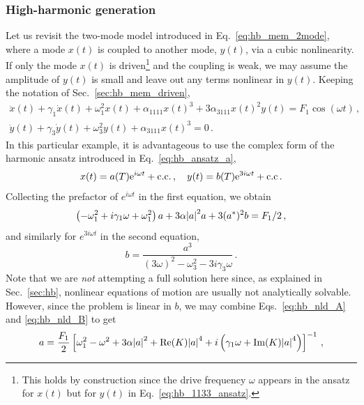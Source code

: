 \subsubsection{High-harmonic generation}

Let us revisit the two-mode model introduced in Eq.~\eqref{eq:hb_mem_2mode}, where a mode $x(t)$ is coupled to another mode, $y(t)$, via a cubic nonlinearity. If only the mode $x(t)$ is driven\footnote{This holds by construction since the drive frequency $\omega$ appears in the ansatz for $x(t)$ but for $y(t)$ in Eq.~\eqref{eq:hb_1133_ansatz}.} and the coupling is weak, we may assume the amplitude of $y(t)$ is small and leave out any terms nonlinear in $y(t)$. Keeping the notation of Sec.~\ref{sec:hb_mem_driven}, 
\begin{equation} \label{eq:hb_nld_eom}
\begin{gathered}
\ddot{x}(t) + \gamma_1 \dot{x}(t) + \omega_1^2 x(t) + \alpha_{1111} x(t)^3 +  3 \alpha_{3111} x(t)^2 y(t) = F_1 \cos(\omega t) \,, \\
\ddot{y}(t) + \gamma_3 \dot{y}(t) + \omega_3^2 y(t) + \alpha_{3111} x(t)^3 = 0 \,.
\end{gathered}
\end{equation}
In this particular example, it is advantageous to use the complex form of the harmonic ansatz introduced in Eq.~\eqref{eq:hb_ansatz_a},
\begin{equation}
x(t) = a(T) {\rm e}^{i \omega t} + \text{c.c.} \,, \quad y(t) = b(T) {\rm e}^{3 i \omega t}  + \text{c.c} \,.
\end{equation}
Collecting the prefactor of  $e^{i \omega t}$ in the first equation, we obtain
\begin{equation} \label{eq:hb_nld_A}
\left(- \omega_1^2 + i \gamma_1 \omega + \omega_1^2\right) a + 3\alpha \abs{a}^2a + 3 (a^*)^2 b = F_1/2 \,,
\end{equation}
and similarly for $e^{3 i \omega t}$ in the second equation, 
\begin{equation} \label{eq:hb_nld_B}
b = \frac{a^3}{(3\omega)^2 - \omega_3^2 - 3 i \gamma_3 \omega} \,.
\end{equation}
Note that we are \textit{not} attempting a full solution here since, as explained in Sec.~\ref{sec:hb}, nonlinear equations of motion are usually not analytically solvable. However, since the problem is linear in $b$, we may combine Eqs.~\eqref{eq:hb_nld_A} and \eqref{eq:hb_nld_B} to get
\begin{equation} \label{eq:hb_nld_selfcons}
a = \frac{F_1}{2} \left[\omega_1^2 - \omega^2 + 3 \alpha \abs{a}^2 + \text{Re} (K) \abs{a}^4  + i \left( \gamma_1 \omega +  \text{Im} (K) \abs{a}^4 \right)\right]^{-1} \,,
\end{equation}
